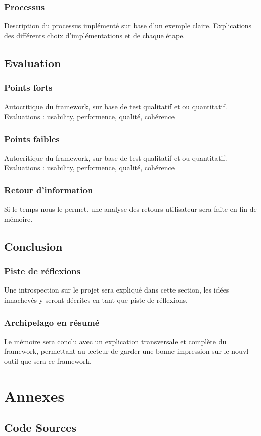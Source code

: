 \documentclass[a4paper,fleqn,12pt]{report}
\begin{document}
\section{Processus}
Description du processus implémenté sur base d'un exemple claire. Explications des différents choix d'implémentations et de chaque étape.
\chapter{Evaluation}
\section{Points forts}
Autocritique du framework, sur base de test qualitatif et ou quantitatif. Evaluations : usability, performence, qualité, cohérence
\section{Points faibles}
Autocritique du framework, sur base de test qualitatif et ou quantitatif.
Evaluations : usability, performence, qualité, cohérence
\section{Retour d'information}
Si le temps nous le permet, une analyse des retours utilisateur sera faite en fin de mémoire.
\chapter{Conclusion}
\section{Piste de réflexions}
Une introspection sur le projet sera expliqué dans cette section, les idées innachevés y seront décrites en tant que piste de réflexions.
\section{Archipelago en résumé}
Le mémoire sera conclu avec un explication transversale et complète du framework, permettant au lecteur de garder une bonne impression sur le nouvl outil que sera ce framework.
\part{Annexes}
\chapter{Code Sources}
\end{document}
